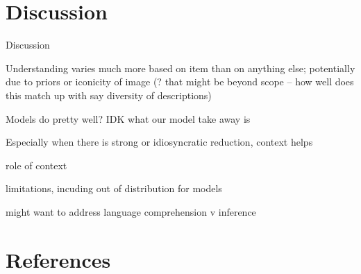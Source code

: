 \documentclass[10pt, letterpaper]{article}
\begin{document}
\section{Discussion}\label{discussion}

Discussion

Understanding varies much more based on item than on anything else;
potentially due to priors or iconicity of image (? that might be beyond
scope -- how well does this match up with say diversity of descriptions)

Models do pretty well? IDK what our model take away is

Especially when there is strong or idiosyncratic reduction, context
helps

role of context

limitations, incuding out of distribution for models

might want to address language comprehension v inference

\section{References}\label{references}

\setlength{\parindent}{-0.1in} 
\setlength{\leftskip}{0.125in}

\noindent


\end{document}
